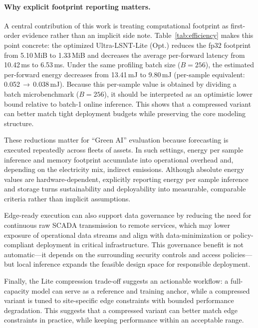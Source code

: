 \documentclass[review,3p,times]{elsarticle}
\begin{document}
\paragraph{Why explicit footprint reporting matters.}\label{subsec:disc_greenai}
A central contribution of this work is treating computational footprint as first-order evidence rather than an implicit side note. Table~\ref{tab:efficiency} makes this point concrete: the optimized Ultra-LSNT-Lite (Opt.) reduces the fp32 footprint from 5.10\,MiB to 1.33\,MiB and decreases the average per-forward latency from 10.42\,ms to 6.53\,ms. Under the same profiling batch size ($B=256$), the estimated per-forward energy decreases from 13.41\,mJ to 9.80\,mJ (per-sample equivalent: 0.052\,$\rightarrow$\,0.038\,mJ). Because this per-sample value is obtained by dividing a batch microbenchmark ($B=256$), it should be interpreted as an optimistic lower bound relative to batch-1 online inference. This shows that a compressed variant can better match tight deployment budgets while preserving the core modeling structure.

These reductions matter for ``Green AI'' evaluation because forecasting is executed repeatedly across fleets of assets. In such settings, energy per sample inference and memory footprint accumulate into operational overhead and, depending on the electricity mix, indirect emissions. Although absolute energy values are hardware-dependent, explicitly reporting energy per sample inference and storage turns sustainability and deployability into measurable, comparable criteria rather than implicit assumptions.

Edge-ready execution can also support data governance by reducing the need for continuous raw SCADA transmission to remote services, which may lower exposure of operational data streams and align with data-minimization or policy-compliant deployment in critical infrastructure. This governance benefit is not automatic---it depends on the surrounding security controls and access policies---but local inference expands the feasible design space for responsible deployment.

Finally, the Lite compression trade-off suggests an actionable workflow: a full-capacity model can serve as a reference and training anchor, while a compressed variant is tuned to site-specific edge constraints with bounded performance degradation. This suggests that a compressed variant can better match edge constraints in practice, while keeping performance within an acceptable range.
\end{document}
